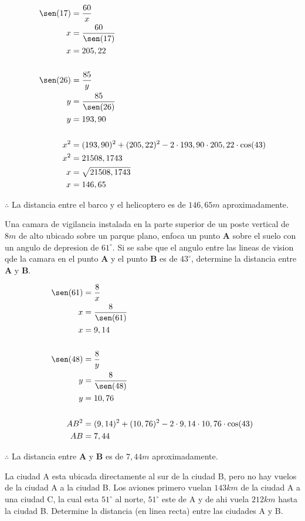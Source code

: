  {
    \[
        \begin{aligned}
            \sen(17) &= \frac{60}{x} \\
            x &= \frac{60}{\sen(17)} \\
            x &= 205,22 \\
            \\
            \sen(26) &= \frac{85}{y} \\
            y &= \frac{85}{\sen(26)} \\
            y &= 193,90 \\
            \\
            x^2 &= (193,90)^2 + (205,22)^2 - 2\cdot 193,90\cdot 205,22\cdot \cos(43) \\
            x^2 &= 21508,1743 \\
            x &= \sqrt{21508,1743} \\
            x &= 146,65
        \end{aligned}
    \]

    $\therefore$ La distancia entre el barco y el helicoptero es de $146,65m$ 
    aproximadamente.
}

 {
    Una camara de vigilancia instalada en la parte superior de un poste vertical de $8m$
    de alto ubicado sobre un parque plano, enfoca un punto $\mathbf{A}$ sobre el suelo 
    con un angulo de depresion de $61^\circ$. Si se sabe que el angulo entre las lineas 
    de vision qde la camara en el punto $\mathbf{A}$ y el punto $\mathbf{B}$ es de 
    $43^\circ$, determine la distancia entre $\mathbf{A}$ y $\mathbf{B}$.
}

 {
    \[
        \begin{aligned}
            \sen(61) &= \frac{8}{x} \\
            x &= \frac{8}{\sen(61)} \\
            x &= 9,14 \\
            \\
            \sen(48) &= \frac{8}{y} \\
            y &= \frac{8}{\sen(48)} \\
            y &= 10,76 \\
            \\
            AB^2 &= (9,14)^2 + (10,76)^2 - 2\cdot 9,14\cdot 10,76\cdot \cos(43) \\
            AB &= 7,44 \\
        \end{aligned}
    \]

    $\therefore$ La distancia entre $\mathbf{A}$ y $\mathbf{B}$ es de $7,44m$
    aproximadamente.
}

 {
    La ciudad A esta ubicada directamente al sur de la ciudad B, pero no hay vuelos de 
    la ciudad A a la ciudad B. Los aviones primero vuelan $143km$ de la ciudad A a una 
    ciudad C, la cual esta $51^\circ$ al norte, $51^\circ$ este de A y de ahi vuela 
    $212km$ hasta la ciudad B. Determine la distancia (en linea recta) entre las ciudades
    A y B.
}
